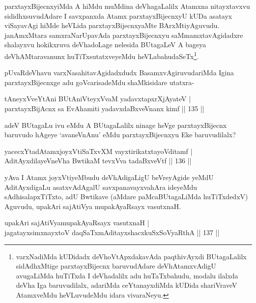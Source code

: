 \begin{artha}
parxtayxBijecnxyiMda A hiMdu muMdina deVhagaLalilx Atamxna nitayxtavxvu sididhxsuvudAdare I savxpanxda Atamx parxtayxBijecnxyU kUDa asatayx viSayavAgi hiMde heVLida parxtayxBijecnxyaMte BArxMtiyAguvudu. janAmxMtara samxraNarUpavAda parxtayxBijecnxyu saMmamxtavAgidadxre shalayxvu hokikxruva deVhadoLage nelesida BUtagaLeV A bageya deVhAMtaravanunx huTiTxsutatxveyeMdu heVLabahudaSeTx\footnote{varxNadiMda kUDidadx deVhoVtApxdakavAda paqthivAyxdi BUtagaLalilx sidAdhxMtige parxtayxBijecnx baruvudAdare deVhAtamxvAdigU avugaLiMda huTiTxda I deVhadalilx adu huTaTxbahudu, modalu ilalxda deVha Iga baruvudilalx, adariMda ceYtanayxdiMda kUDida shariVraveV AtamxveMdu heVLuvudeMdu idara vivaraNeyu.}.
\end{artha}

\begin{artha}
pUvaRdeVhavu varxNasahitavAgidadxdudx BasamxvAgiruvudariMda Igina parxtayxBijecnxge adu goVcarisadeMdu shaMkisidare utatxra-
\end{artha}

\begin{shl}
tAneyxVveYtAni BUtAniVteyxVvaM yadavxtapxrXjAyateV  | \\
parxtayxBijAcnx sa EvAhamiti yadavxdaBxveVnanx kimf \hfill||  135 ||  
\end{shl}

\begin{artha}
adeV BUtagaLu ivu eMdu A BUtagaLalilx ninage heVge parxtayxBijecnx baruvudo hAgeye `avaneVnAnu' eMdu parxtayxBijecnxyu Eke baruvudilalx?
\end{artha}

\begin{shl}
yacecxYtadAtamxjoyxVtiSaTxvXM vayxtirikatxtayoVditamf | \\
AditAyxdilayeVneVha BwtikaM tevxVva tadaBxveVtf \hfill||  136 ||  
\end{shl}

\begin{artha}
yAva I Atamx joyxVtiyeMbudu deVhAdigaLigU beVreyAgide yeMdU AditAyxdigaLu asatxvAdAgalU savxpanavayxvahAra ideyeMdu sAdhisalapxTiTxto, adU Bwtikave (aMdare paMcaBUtagaLiMda huTiTxdedxV) Aguvudu, upakAri sajAtiVya mupakAyaRsayx vasutxnaH.
\end{artha}

\begin{shl}
upakAri sajAtiVyamupakAyaRsayx vasutxnaH | \\
jagatayxsimxnayxtoV daqSaTxmAditayxshacxkuSxSoVyaRthA \hfill||  137 ||  
\end{shl}

